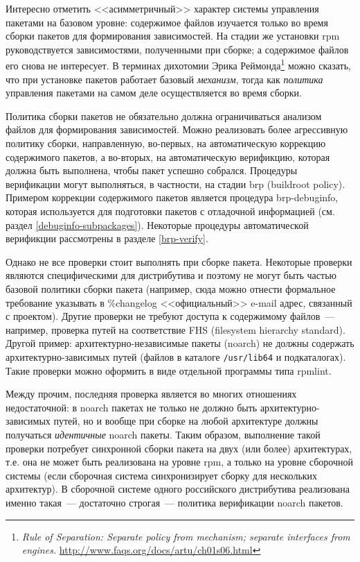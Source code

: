 \documentclass[russian,a4paper,12pt,titlepage]{article}
\begin{document}
Интересно отметить <<асимметричный>> характер системы управления пакетами на базовом уровне: содержимое
файлов изучается только во время сборки пакетов для формирования зависимостей.  На стадии же установки
rpm руководствуется зависимостями, полученными при сборке; а содержимое файлов его снова не интересует.
В терминах дихотомии Эрика Реймонда\footnote{\textit{Rule of Separation: Separate policy from mechanism;
separate interfaces from engines.} \url{http://www.faqs.org/docs/artu/ch01s06.html}}
можно сказать, что при установке пакетов работает базовый \textit{механизм}, тогда как \textit{политика}
управления пакетами на самом деле осуществляется во время сборки.

Политика сборки пакетов не обязательно должна ограничиваться анализом файлов для формирования зависимостей.
Можно реализовать более агрессивную политику сборки, направленную, во-первых, на автоматическую коррекцию содержимого
пакетов, а во-вторых, на автоматическую верификцию, которая должна быть выполнена, чтобы пакет успешно собрался.
Процедуры верификации могут выполняться, в частности, на стадии brp (buildroot policy).  Примером коррекции содержимого
пакетов является процедура brp-debuginfo, которая используется для подготовки пакетов с отладочной информацией (см. раздел
\ref{debuginfo-subpackages}).  Некоторые процедуры автоматической верификции рассмотрены в разделе \ref{brp-verify}.

Однако не все проверки стоит выполнять при сборке пакета.  Некоторые проверки
являются специфическими для дистрибутива и поэтому не могут быть частью базовой
политики сборки пакета (например, сюда можно отнести формальное требование указывать
в \%changelog <<официальный>> e-mail адрес, связанный с проектом).  Другие проверки не требуют
доступа к содержимому файлов~--- например, проверка путей на соответствие FHS (filesystem hierarchy standard).
Другой пример: архитектурно-независимые пакеты (noarch) не должны содержать архитектурно-зависимых путей
(файлов в каталоге \verb|/usr/lib64| и подкаталогах).  Такие проверки можно оформить в виде отдельной программы
типа rpmlint.

Между прочим, последняя проверка является во многих отношениях недостаточной: в noarch пакетах не только не должно быть
архитектурно-зависимых путей, но и вообще при сборке на любой архитектуре должны получаться \emph{идентичные} noarch пакеты.
Таким образом, выполнение такой проверки потребует синхронной сборки пакета на двух (или более) архитектурах, т.е.
она не может быть реализована на уровне rpm, а только на уровне сборочной системы (если сборочная система синхронизирует
сборку для нескольких архитектур).  В сборочной системе одного российского дистрибутива реализована именно такая~--- достаточно
строгая~--- политика верификации noarch пакетов.
\end{document}
